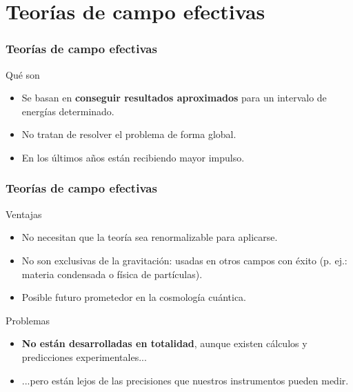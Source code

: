 \documentclass{beamer}
\begin{document}
\section{Teorías de campo efectivas}
\begin{frame}
\frametitle{Teorías de campo efectivas}
\begin{block}{Qué son}
  \begin{itemize}
    \item Se basan en \textbf{conseguir resultados aproximados} para un intervalo de energías determinado.
    \item No tratan de resolver el problema de forma global.
    \item En los últimos años están recibiendo mayor impulso.
  \end{itemize}
\end{block}
\end{frame}
%
%
\begin{frame}
\frametitle{Teorías de campo efectivas}
\begin{exampleblock}{Ventajas}
  \begin{itemize}
    \item No necesitan que la teoría sea renormalizable para aplicarse.
    \item No son exclusivas de la gravitación: usadas en otros campos con éxito (p. ej.: materia condensada o física de partículas).
    \item Posible futuro prometedor en la cosmología cuántica.
  \end{itemize}
\end{exampleblock}
\begin{alertblock}{Problemas}
  \begin{itemize}
    \item \textbf{No están desarrolladas en totalidad}, aunque existen cálculos y predicciones experimentales...
    \item ...pero están lejos de las precisiones que nuestros instrumentos pueden medir.
  \end{itemize}
\end{alertblock}
\end{frame}
%
%
\end{document}
